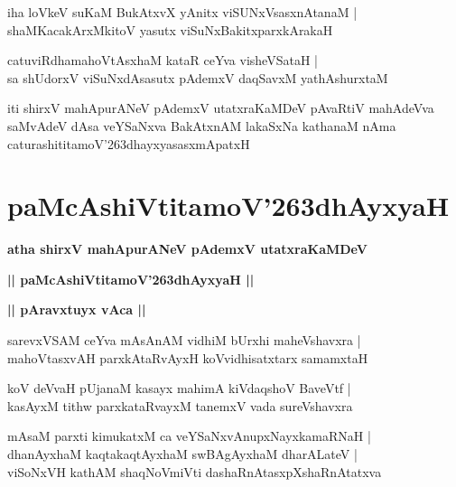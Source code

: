 \documentclass[twoside,12pt,openright]{book}
\def\S{\char'263}
\newcounter{shloka}[chapter]
\def\uvaca#1{\centerline{{\large\textbf{#1}}}}
\begin{document}
\begin{shloka}%
iha loVkeV suKaM BukAtxvX yAnitx viSUNxVsasxnAtanaM |\\
shaMKacakArxMkitoV yasutx viSuNxBakitxparxkArakaH 
\end{shloka}

\begin{shloka}%
catuviRdhamahoVtAsxhaM kataR ceYva visheVSataH |\\
sa shUdorxV viSuNxdAsasutx pAdemxV daqSavxM yathAshurxtaM 
\end{shloka}

\begin{center}
iti shirxV mahApurANeV pAdemxV utatxraKaMDeV pAvaRtiV mahAdeVva saMvAdeV dAsa veYSaNxva BakAtxnAM 
lakaSxNa kathanaM nAma caturashititamoV\S dhayxyasasxmApatxH
\end{center}

\chapter{paMcAshiVtitamoV\S dhAyxyaH}

\begin{center}
{\LARGE\bfseries atha shirxV mahApurANeV pAdemxV utatxraKaMDeV}
\end{center}

\begin{center}
{\LARGE\bfseries || paMcAshiVtitamoV\S dhAyxyaH || }
\end{center}

\uvaca{|| pAravxtuyx vAca ||}

\begin{shloka}%
sarevxVSAM ceYva mAsAnAM vidhiM bUrxhi maheVshavxra |\\
mahoVtasxvAH parxkAtaRvAyxH koVvidhisatxtarx samamxtaH 
\end{shloka}

\begin{shloka}%
koV deVvaH pUjanaM kasayx mahimA kiVdaqshoV BaveVtf |\\
kasAyxM tithw parxkataRvayxM tanemxV vada sureVshavxra
\end{shloka}

\begin{shloka}%
mAsaM parxti kimukatxM ca veYSaNxvAnupxNayxkamaRNaH |\\
dhanAyxhaM kaqtakaqtAyxhaM swBAgAyxhaM dharALateV |\\
viSoNxVH kathAM shaqNoVmiVti dashaRnAtasxpXshaRnAtatxva
\end{shloka}
\end{document}

